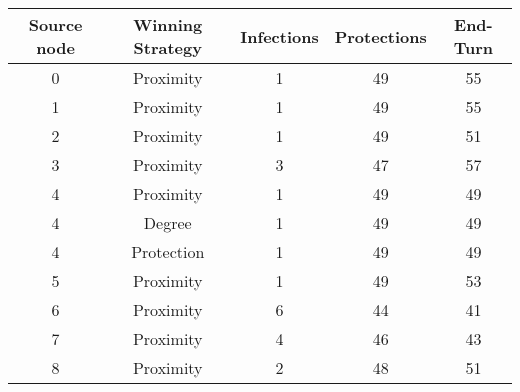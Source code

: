 \documentclass[results.tex]{subfiles}
\begin{document}
    \begin{center}
        \begin{tabular}{| c || c | c | c | c |}
            \hline
            {\bfseries Source node} & {\bfseries Winning Strategy} & {\bfseries Infections} & {\bfseries Protections}
            & {\bfseries End-Turn}
            \\  %
            \hline\hline
            0                       & Proximity                    & 1                      & 49                      & 55                   \\
            \hline
            1                       & Proximity                    & 1                      & 49                      & 55                   \\
            \hline
            2                       & Proximity                    & 1                      & 49                      & 51                   \\
            \hline
            3                       & Proximity                    & 3                      & 47                      & 57                   \\
            \hline
            4                       & Proximity                    & 1                      & 49                      & 49                   \\
            \hline
            4                       & Degree                       & 1                      & 49                      & 49                   \\
            \hline
            4                       & Protection                   & 1                      & 49                      & 49                   \\
            \hline
            5                       & Proximity                    & 1                      & 49                      & 53                   \\
            \hline
            6                       & Proximity                    & 6                      & 44                      & 41                   \\
            \hline
            7                       & Proximity                    & 4                      & 46                      & 43                   \\
            \hline
            8                       & Proximity                    & 2                      & 48                      & 51                   \\

\end{tabular}
\end{center}
\end{document}
